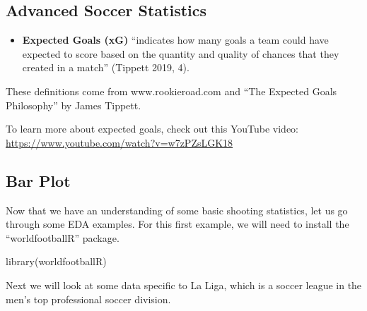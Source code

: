 \documentclass[
  11pt,
]{book}
\newenvironment{Shaded}{\begin{snugshade}}{\end{snugshade}}
\newcommand{\FunctionTok}[1]{\textcolor[rgb]{0.00,0.00,0.00}{#1}}
\newcommand{\NormalTok}[1]{#1}
\providecommand{\tightlist}{%
  \setlength{\itemsep}{0pt}\setlength{\parskip}{0pt}}
\theoremstyle{definition}
\theoremstyle{definition}
\theoremstyle{definition}
\theoremstyle{definition}
\theoremstyle{remark}
\begin{document}
\hypertarget{advanced-soccer-statistics}{%
\subsection{Advanced Soccer Statistics}\label{advanced-soccer-statistics}}

\begin{itemize}
\tightlist
\item
  \textbf{Expected Goals (xG)} ``indicates how many goals a team could have expected to score based on the quantity and quality of chances that they created in a match'' (Tippett 2019, 4).
\end{itemize}

These definitions come from www.rookieroad.com and ``The Expected Goals Philosophy'' by James Tippett.

To learn more about expected goals, check out this YouTube video:\\
\url{https://www.youtube.com/watch?v=w7zPZsLGK18}

\newpage

\hypertarget{bar-plot}{%
\subsection{Bar Plot}\label{bar-plot}}

Now that we have an understanding of some basic shooting statistics, let us go through some EDA examples. For this first example, we will need to install the ``worldfootballR'' package.

\begin{Shaded}
\begin{Highlighting}[]
\FunctionTok{library}\NormalTok{(worldfootballR)}
\end{Highlighting}
\end{Shaded}

Next we will look at some data specific to La Liga, which is a soccer league in the men's top professional soccer division.
\end{document}
